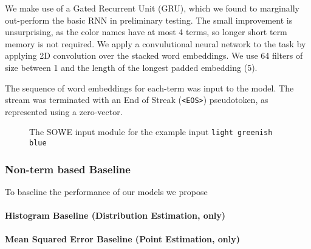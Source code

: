 \documentclass[11pt,a4paper]{article}
\newcommand{\natlang}[1]{\texttt{#1}}
\begin{document}
We make use of a Gated Recurrent Unit (GRU), 
which we found to marginally out-perform the basic RNN in preliminary testing.
The small improvement is unsurprising, as the color names have at most 4 terms,
so longer short term memory is not required.
We apply a convulutional neural network to the task by applying 2D convolution over the stacked word embeddings.
We use 64 filters of size between 1 and the length of the longest padded embedding (5).

The sequence of word embeddings for each-term was input to the model.
The stream was terminated with an End of Streak (\natlang{<EOS>}) pseudotoken,
as represented using a zero-vector.


\begin{figure}
	
	\caption{The SOWE input module for the example input \natlang{light greenish blue}}
	\label{fig:sowemod}
\end{figure}



\subsubsection{Non-term based Baseline}
To baseline the performance of our models we propose 
\paragraph{Histogram Baseline (Distribution Estimation, only)}
\paragraph{Mean Squared Error Baseline (Point Estimation, only)}
\end{document}
